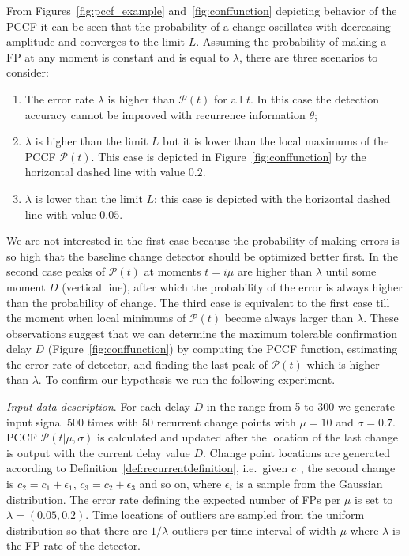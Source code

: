 From Figures~\ref{fig:pccf_example} and~\ref{fig:conffunction} depicting behavior of the PCCF it can be seen that the probability of a change oscillates with decreasing amplitude and converges to the limit $L$.
Assuming the probability of making a FP at any moment is constant and is equal to $\lambda$, there are three scenarios to consider:
\begin{enumerate}
\setlength\itemsep{0pt}
\item The error rate $\lambda$ is higher than $\mathcal{P}(t)$ for all $t$.
In this case the detection accuracy cannot be improved with recurrence information $\theta$;
\item $\lambda$ is higher than the limit $L$ but it is lower than the local maximums of the PCCF $\mathcal{P}(t)$. This case is depicted in Figure~\ref{fig:conffunction} by the horizontal dashed line with value $0.2$.
\item $\lambda$ is lower than the limit $L$; this case is depicted with the horizontal dashed line with value $0.05$.
\end{enumerate}
We are not interested in the first case because the probability of making errors is so high that the baseline change detector should be optimized better first.
In the second case peaks of $\mathcal{P}(t)$ at moments $t = i \mu$ are higher than $\lambda$ until some moment $D$ (vertical line), after which the probability of the error is always higher than the probability of change.
The third case is equivalent to the first case till the moment when local minimums of $\mathcal{P}(t)$ become always larger than $\lambda$.
These observations suggest that we can determine the maximum tolerable confirmation delay $D$ (Figure~\ref{fig:conffunction}) by computing the PCCF function, estimating the error rate of detector, and finding the last peak of $\mathcal{P}(t)$ which is higher than $\lambda$.
To confirm our hypothesis we run the following experiment.

\emph{Input data description}.
For each delay $D$ in the range from 5 to 300 we generate input signal $500$ times with $50$ recurrent change points with $\mu = 10$ and $\sigma = 0.7$.
PCCF $\mathcal{P}(t | \mu, \sigma)$ is calculated and updated after the location of the last change is output with the current delay value $D$.
Change point locations are generated according to Definition~\ref{def:recurrentdefinition}, i.e.\ given  $c_1$, the second change is $c_2 = c_1 + \epsilon_1$, $c_3 = c_2 + \epsilon_3$ and so on,  where $\epsilon_i$ is a sample from the Gaussian distribution. %
The error rate defining the expected number of FPs per $\mu$ is set to $\lambda = (0.05, 0.2)$.
Time locations of outliers are sampled from the uniform distribution so that there are $1/\lambda$ outliers per time interval of width $\mu$ where $\lambda$ is the FP rate of the detector.

